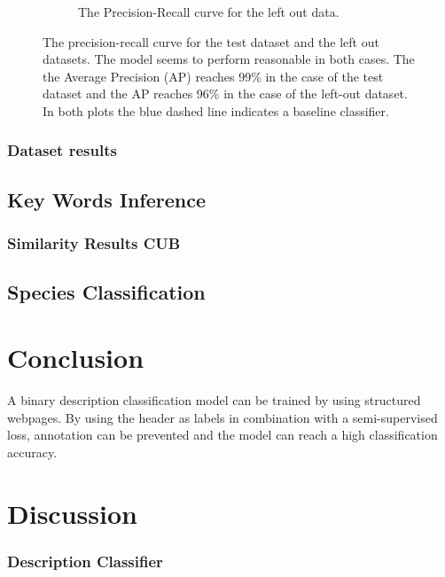 \documentclass[a4paper, 12pt, oneside]{book} %
\begin{document}
\begin{figure} [h!]
\begin{subfigure}[b]{0.49\textwidth}
         \caption{The Precision-Recall curve for the left out data.}
         \label{fig:precision_recall_curve_test_external}
     \end{subfigure}
     \caption[Precision recall curves for test and left-out datasets]{The precision-recall curve for the test dataset and the left out datasets. The model seems to perform reasonable in both cases. The the Average Precision (AP) reaches 99\% in the case of the test dataset and the AP reaches 96\% in the case of the left-out dataset. In both plots the blue dashed line indicates a baseline classifier.}
     \label{fig:precision-recall}
\end{figure}

\subsubsection{Dataset results}
\subsection{Key Words Inference}
\subsubsection{Similarity Results CUB}
\subsection{Species Classification}
\subsubsection{}
\section{Conclusion} \label{par:conclusion}
A binary description classification model can be trained by using structured webpages. 
By using the header as labels in combination with a semi-supervised loss, annotation can be prevented and the model can reach a high classification accuracy.

\section{Discussion} \label{par:discussion}
\subsubsection{Description Classifier}



\printbibliography
\end{document}
